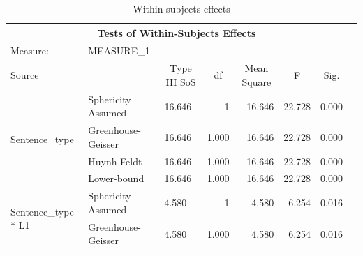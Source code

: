 \documentclass[a4paper]{article}
\begin{document}
\begin{table}[H]
  \begin{center}
      \caption{Within-subjects effects}
      \label{tab:withinsub2}
\begin{tabular}{p{}p{}|l|r|r|r|r|r|} 
\hline
\multicolumn{7}{|c|}{Tests of Within-Subjects Effects}                                                                                                                                                                              \\ 
\hline
Measure:~                                               & MEASURE\_1         & \multicolumn{1}{l|}{}             & \multicolumn{1}{l|}{}   & \multicolumn{1}{l|}{}            & \multicolumn{1}{l|}{}  & \multicolumn{1}{l|}{}      \\ 
\hline
Source                                                  & ~                  & \multicolumn{1}{c|}{Type III SoS} & \multicolumn{1}{c|}{df} & \multicolumn{1}{c|}{Mean Square} & \multicolumn{1}{c|}{F} & \multicolumn{1}{c|}{Sig.}  \\ 
\hline
\multirow{4}{*}{Sentence\_type}                         & Sphericity Assumed & 16.646                            & 1                       & 16.646                           & 22.728                 & 0.000                      \\ 
\cline{2-7}
                                                        & Greenhouse-Geisser & 16.646                            & 1.000                   & 16.646                           & 22.728                 & 0.000                      \\ 
\cline{2-7}
                                                        & Huynh-Feldt        & 16.646                            & 1.000                   & 16.646                           & 22.728                 & 0.000                      \\ 
\cline{2-7}
                                                        & Lower-bound        & 16.646                            & 1.000                   & 16.646                           & 22.728                 & 0.000                      \\ 
\hline
\multirow{4}{*}{Sentence\_type * L1}                    & Sphericity Assumed & 4.580                             & 1                       & 4.580                            & 6.254                  & 0.016                      \\ 
\cline{2-7}
                                                        & Greenhouse-Geisser & 4.580                             & 1.000                   & 4.580                            & 6.254                  & 0.016                      \\ 

\end{tabular}
\end{center}
\end{table}
\end{document}
